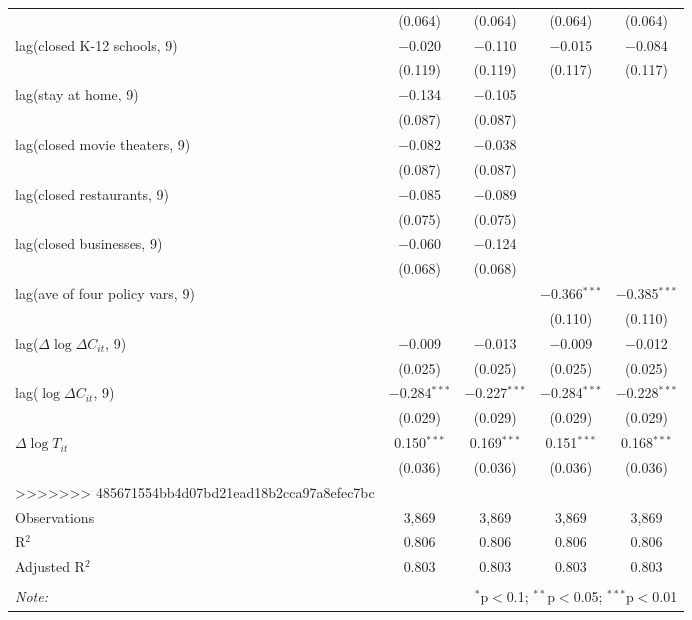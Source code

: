 \begin{tabular}{@{\extracolsep{1pt}}lcccc}
  & (0.064) & (0.064) & (0.064) & (0.064) \\ 
  lag(closed K-12 schools, 9) & $-$0.020 & $-$0.110 & $-$0.015 & $-$0.084 \\ 
  & (0.119) & (0.119) & (0.117) & (0.117) \\ 
  lag(stay at home, 9) & $-$0.134 & $-$0.105 &  &  \\ 
  & (0.087) & (0.087) &  &  \\ 
  lag(closed movie theaters, 9) & $-$0.082 & $-$0.038 &  &  \\ 
  & (0.087) & (0.087) &  &  \\ 
  lag(closed restaurants, 9) & $-$0.085 & $-$0.089 &  &  \\ 
  & (0.075) & (0.075) &  &  \\ 
  lag(closed businesses, 9) & $-$0.060 & $-$0.124 &  &  \\ 
  & (0.068) & (0.068) &  &  \\ 
  lag(ave of four policy vars, 9) &  &  & $-$0.366$^{***}$ & $-$0.385$^{***}$ \\ 
  &  &  & (0.110) & (0.110) \\ 
  lag($\Delta \log \Delta C_{it}$, 9) & $-$0.009 & $-$0.013 & $-$0.009 & $-$0.012 \\ 
  & (0.025) & (0.025) & (0.025) & (0.025) \\ 
  lag($\log \Delta C_{it}$, 9) & $-$0.284$^{***}$ & $-$0.227$^{***}$ & $-$0.284$^{***}$ & $-$0.228$^{***}$ \\ 
  & (0.029) & (0.029) & (0.029) & (0.029) \\ 
  $\Delta \log T_{it}$ & 0.150$^{***}$ & 0.169$^{***}$ & 0.151$^{***}$ & 0.168$^{***}$ \\ 
  & (0.036) & (0.036) & (0.036) & (0.036) \\ 
>>>>>>> 485671554bb4d07bd21ead18b2cca97a8efec7bc
 \hline \\[-1.8ex] 
Observations & 3,869 & 3,869 & 3,869 & 3,869 \\ 
R$^{2}$ & 0.806 & 0.806 & 0.806 & 0.806 \\ 
Adjusted R$^{2}$ & 0.803 & 0.803 & 0.803 & 0.803 \\ 
\hline 
\hline \\[-1.8ex] 
\textit{Note:}  & \multicolumn{4}{r}{$^{*}$p$<$0.1; $^{**}$p$<$0.05; $^{***}$p$<$0.01} \\ 
\end{tabular} 